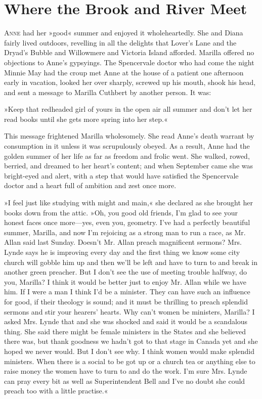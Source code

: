\chapter{Where the Brook and River Meet}

\lettrine[lines=4]{A}{nne} had her »good« summer and enjoyed it wholeheartedly. She and Diana fairly lived outdoors, revelling in all the delights that Lover's Lane and the Dryad's Bubble and Willowmere and Victoria Island afforded. Marilla offered no objections to Anne's gypsyings. The Spencervale doctor who had come the night Minnie May had the croup met Anne at the house of a patient one afternoon early in vacation, looked her over sharply, screwed up his mouth, shook his head, and sent a message to Marilla Cuthbert by another person. It was:

»Keep that redheaded girl of yours in the open air all summer and don't let her read books until she gets more spring into her step.«

This message frightened Marilla wholesomely. She read Anne's death warrant by consumption in it unless it was scrupulously obeyed. As a result, Anne had the golden summer of her life as far as freedom and frolic went. She walked, rowed, berried, and dreamed to her heart's content; and when September came she was bright-eyed and alert, with a step that would have satisfied the Spencervale doctor and a heart full of ambition and zest once more.

»I feel just like studying with might and main,« she declared as she brought her books down from the attic. »Oh, you good old friends, I'm glad to see your honest faces once more—yes, even you, geometry. I've had a perfectly beautiful summer, Marilla, and now I'm rejoicing as a strong man to run a race, as Mr. Allan said last Sunday. Doesn't Mr. Allan preach magnificent sermons? Mrs. Lynde says he is improving every day and the first thing we know some city church will gobble him up and then we'll be left and have to turn to and break in another green preacher. But I don't see the use of meeting trouble halfway, do you, Marilla? I think it would be better just to enjoy Mr. Allan while we have him. If I were a man I think I'd be a minister. They can have such an influence for good, if their theology is sound; and it must be thrilling to preach splendid sermons and stir your hearers' hearts. Why can't women be ministers, Marilla? I asked Mrs. Lynde that and she was shocked and said it would be a scandalous thing. She said there might be female ministers in the States and she believed there was, but thank goodness we hadn't got to that stage in Canada yet and she hoped we never would. But I don't see why. I think women would make splendid ministers. When there is a social to be got up or a church tea or anything else to raise money the women have to turn to and do the work. I'm sure Mrs. Lynde can pray every bit as well as Superintendent Bell and I've no doubt she could preach too with a little practise.«


